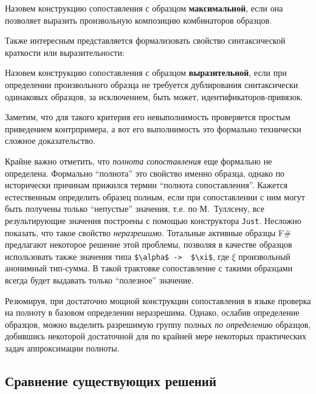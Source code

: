 \begin{defn}[Максимальность]
Назовем конструкцию сопоставления с образцом \textbf{максимальной}, если она позволяет выразить произвольную композицию комбинаторов образцов.
\end{defn}

Также интересным представляется формализовать свойство синтаксической краткости или выразительности:

\begin{definition}[Выразительность]
Назовем конструкцию сопоставления с образцом \textbf{выразительной}, если при определении произвольного образца не требуется дублирования синтаксически одинаковых образцов, за исключением, быть может, идентификаторов-привязок.
\end{definition}

Заметим, что для такого критерия его невыполнимость проверяется простым приведением контрпримера, а вот его выполнимость это формально технически сложное доказательство.

Крайне важно отметить, что \textit{полнота сопоставления} еще формально не определена. Формально ``полнота'' это свойство именно образца, однако по исторически причинам прижился термин ``полнота сопоставления''. Кажется естественным определить образец полным, если при сопоставлении с ним могут быть получены только ``непустые'' значения, т.е. по М.~Туллсену, все результирующие значения построены с помощью конструктора \lstinline|Just|. Несложно показать, что такое свойство \textit{неразрешимо}. Тотальные активные образцы F\# предлагают некоторое решение этой проблемы, позволяя в качестве образцов использовать также значения типа \lstinline|$\alpha$ ->  $\xi$|, где $\xi$ произвольный анонимный тип-сумма. В такой трактовке сопоставление с такими образцами всегда будет выдавать только ``полезное'' значение. 

Резюмируя, при достаточно мощной конструкции сопоставления в языке проверка на полноту в базовом определении неразрешима. Однако, ослабив определение образцов, можно выделить разрешимую группу полных \textit{по определению} образцов, добившись некоторой достаточной для по крайней мере некоторых практических задач аппроксимации полноты.


\subsection{Сравнение существующих решений}

